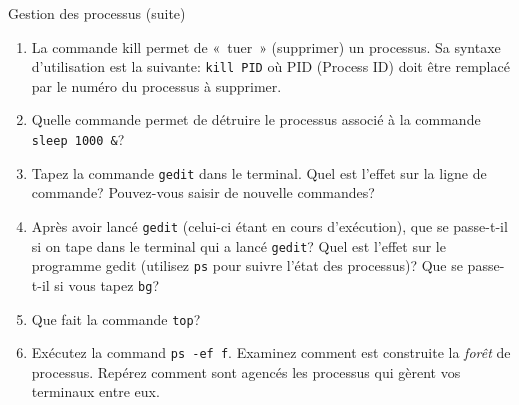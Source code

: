 \begin{exercice}
  \begin{exercicelet}{Gestion des processus (suite)}
    \begin{enumerate}\setcounter{enumi}{\value{cnti}}
      \setcounter{cnti}{\value{enumi}}
    \item La commande kill permet de «~tuer~» (supprimer) un
      processus. Sa syntaxe d'utilisation est la suivante: \texttt{kill
        PID} où PID (Process ID) doit être remplacé par le numéro du
      processus à supprimer.  \setcounter{cnti}{\value{enumi}}
    \item Quelle commande permet de détruire le processus associé à
      la commande \verb|sleep 1000 &|?
    \item Tapez la commande \texttt{gedit} dans le terminal. Quel
      est l'effet sur la ligne de commande? Pouvez-vous saisir de
      nouvelle commandes?
    \item Après avoir lancé \texttt{gedit} (celui-ci étant en cours
      d'exécution), que se passe-t-il si on tape \Ctrl{} dans
      le terminal qui a lancé \texttt{gedit}? Quel est l'effet sur le programme
      gedit (utilisez \texttt{ps} pour suivre l'état des processus)? Que se
      passe-t-il si vous tapez \texttt{bg}?
    \item Que fait la commande \texttt{top}?
    \item Exécutez la command \texttt{ps -ef f}. Examinez comment est
      construite la \emph{forêt} de processus. Repérez comment sont
      agencés les processus qui gèrent vos terminaux entre eux.
      \setcounter{cnti}{\value{enumi}}
    \end{enumerate}
  \end{exercicelet}
\end{exercice}
